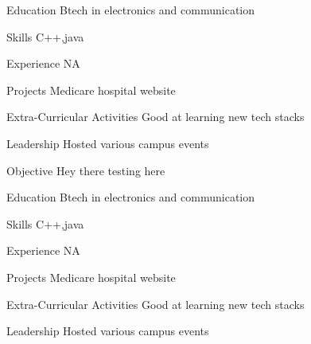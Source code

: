 \documentclass{resume}
\begin{document}
\begin{rSection}{Education}
Btech in electronics and communication
\end{rSection}

\begin{rSection}{Skills}
C++,java
\end{rSection}

\begin{rSection}{Experience}
NA
\end{rSection}

\begin{rSection}{Projects}
Medicare hospital website
\end{rSection}

\begin{rSection}{Extra-Curricular Activities}
Good at learning new tech stacks
\end{rSection}

\begin{rSection}{Leadership}
Hosted various campus events
\end{rSection}

\begin{rSection}{Objective}
Hey there testing here
\end{rSection}

\begin{rSection}{Education}
Btech in electronics and communication
\end{rSection}

\begin{rSection}{Skills}
C++,java
\end{rSection}

\begin{rSection}{Experience}
NA
\end{rSection}

\begin{rSection}{Projects}
Medicare hospital website
\end{rSection}

\begin{rSection}{Extra-Curricular Activities}
Good at learning new tech stacks
\end{rSection}

\begin{rSection}{Leadership}
Hosted various campus events
\end{rSection}
\end{document}

